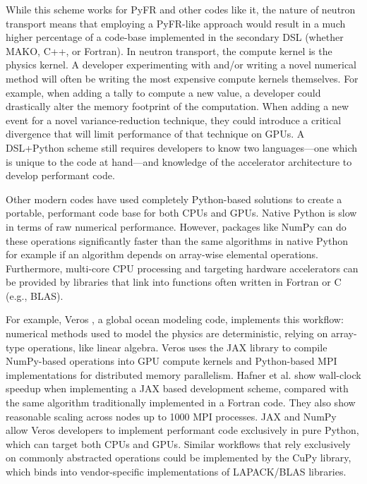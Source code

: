 While this scheme works for PyFR and other codes like it, the nature of neutron transport means that employing a PyFR-like approach would result in a much higher percentage of a code-base implemented in the secondary DSL (whether MAKO, C++, or Fortran). 
In neutron transport, the compute kernel is the physics kernel.
A developer experimenting with and/or writing a novel numerical method will often be writing the most expensive compute kernels themselves. 
For example, when adding a tally to compute a new value, a developer could drastically alter the memory footprint of the computation. 
When adding a new event for a novel variance-reduction technique, they could introduce a critical divergence that will limit performance of that technique on GPUs. 
A DSL+Python scheme still requires developers to know two languages---one which is unique to the code at hand---and knowledge of the accelerator architecture to develop performant code.

Other modern codes have used completely Python-based solutions to create a portable, performant code base for both CPUs and GPUs.
Native Python is slow in terms of raw numerical performance.
However, packages like NumPy \cite{van_der_walt_numpy_2011} can do these operations significantly faster than the same algorithms in native Python for example if an algorithm depends on array-wise elemental operations.
Furthermore, multi-core CPU processing and targeting hardware accelerators can be provided by libraries that link into functions often written in Fortran or C (e.g., BLAS).

For example, Veros \cite{hafner_fast_2021}, a global ocean modeling code, implements this workflow:
numerical methods used to model the physics are deterministic, relying on array-type operations, like linear algebra. 
Veros uses the JAX library \cite{jax2018github} to compile NumPy-based operations into GPU compute kernels and Python-based MPI implementations for distributed memory parallelism. 
Hafner et al. \cite{hafner_fast_2021} show wall-clock speedup when implementing a JAX based development scheme, compared with the same algorithm traditionally implemented in a Fortran code.
They also show reasonable scaling across nodes up to 1000 MPI processes. 
JAX and NumPy allow Veros developers to implement performant code exclusively in pure Python, which can target both CPUs and GPUs.
Similar workflows that rely exclusively on commonly abstracted operations could be implemented by the CuPy \cite{cupy_learningsys2017} library, which binds into vendor-specific implementations of LAPACK/BLAS libraries.

